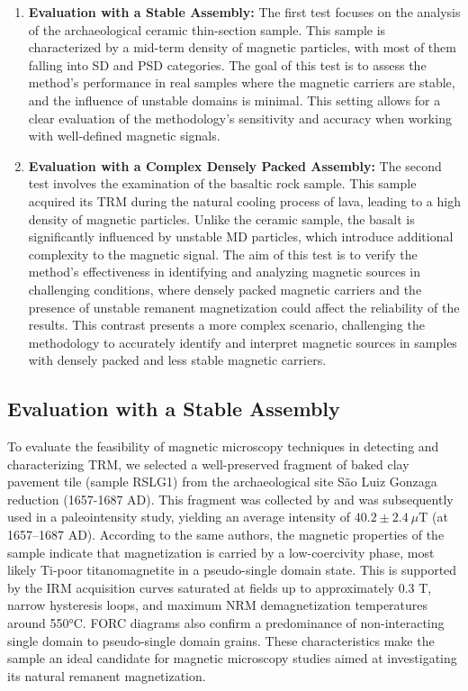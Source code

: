 \begin{enumerate}
\item \textbf{Evaluation with a Stable Assembly:}
The first test focuses on the analysis of the archaeological ceramic thin-section sample. This sample is characterized by a mid-term density of magnetic particles, with most of them falling into SD and PSD categories. The goal of this test is to assess the method’s performance in real samples where the magnetic carriers are stable, and the influence of unstable domains is minimal. This setting allows for a clear evaluation of the methodology’s sensitivity and accuracy when working with well-defined magnetic signals.

\item \textbf{Evaluation with a Complex Densely Packed Assembly:}
The second test involves the examination of the basaltic rock sample. This sample acquired its TRM during the natural cooling process of lava, leading to a high density of magnetic particles. Unlike the ceramic sample, the basalt is significantly influenced by unstable MD particles, which introduce additional complexity to the magnetic signal. The aim of this test is to verify the method’s effectiveness in identifying and analyzing magnetic sources in challenging conditions, where densely packed magnetic carriers and the presence of unstable remanent magnetization could affect the reliability of the results. This contrast presents a more complex scenario, challenging the methodology to accurately identify and interpret magnetic sources in samples with densely packed and less stable magnetic carriers.
\end{enumerate}


\subsection{Evaluation with a Stable Assembly}

To evaluate the feasibility of magnetic microscopy techniques in detecting and characterizing TRM, we selected a well-preserved fragment of baked clay pavement tile (sample RSLG1) from the archaeological site São Luiz Gonzaga reduction (1657-1687 AD). This fragment was collected by \citet{Poletti2016} and was subsequently used in a paleointensity study, yielding an average intensity of $40.2 \pm 2.4\ \mu\text{T}$ (at 1657–1687 AD). According to the same authors, the magnetic properties of the sample indicate that magnetization is carried by a low-coercivity phase, most likely Ti-poor titanomagnetite in a pseudo-single domain state. This is supported by the IRM acquisition curves saturated at fields up to approximately 0.3 T, narrow hysteresis loops, and maximum NRM demagnetization temperatures around 550°C. FORC diagrams also confirm a predominance of non-interacting single domain to pseudo-single domain grains. These characteristics make the sample an ideal candidate for magnetic microscopy studies aimed at investigating its natural remanent magnetization.


